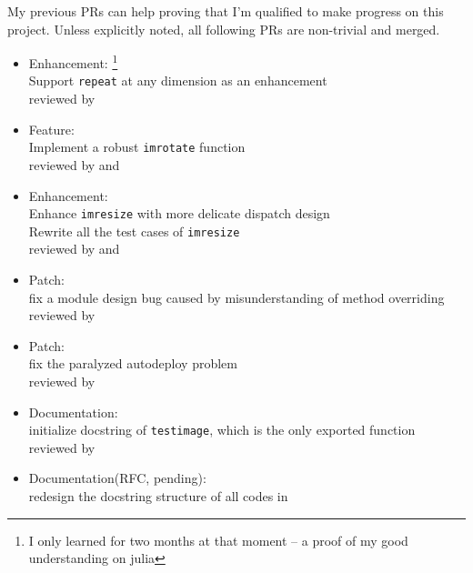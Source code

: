 My previous PRs can help proving that I'm qualified to make progress on this project. Unless explicitly noted, all following PRs are non-trivial and merged.
\begin{itemize}
    \item Enhancement: \footnote{I only learned \langjulia{} for two months at that moment -- a proof of my good understanding on julia}\\
      {\small
      Support \texttt{repeat} at any dimension as an enhancement\\
      reviewed by \mbauman
      }
    \item Feature: \\
      {\small
      Implement a robust \texttt{imrotate} function\\
      reviewed by \evizero and \timholy
      }
    \item Enhancement: \\
      {\small
      Enhance \texttt{imresize} with more delicate dispatch design\\
      Rewrite all the test cases of \texttt{imresize}\\
      reviewed by \evizero and \timholy
      }
    \item Patch: \\
      {\small
      fix a module design bug caused by misunderstanding of method overriding\\
      reviewed by \julio
      }
    \item Patch:  \\
      {\small
      fix the paralyzed autodeploy problem\\
      reviewed by \evizero
      }
    \item Documentation: \\
      {\small
      initialize docstring of \texttt{testimage}, which is the only exported function\\
      reviewed by \timholy
      }
    \item Documentation(RFC, pending): \\
      {\small
      redesign the docstring structure of all codes in \imagebinarization\\
}
\end{itemize}
